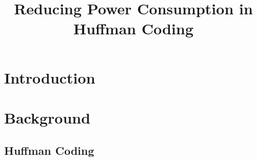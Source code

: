\documentclass[preprint,12pt]{elsarticle}
\begin{document}
\begin{frontmatter}



\title{Reducing Power Consumption in Huffman Coding}


\author{}

\address{}

\begin{abstract}

\end{abstract}

\begin{keyword}



\end{keyword}

\end{frontmatter}


\section{Introduction}
\section{Background}
\subsection{Huffman Coding}
\end{document}
